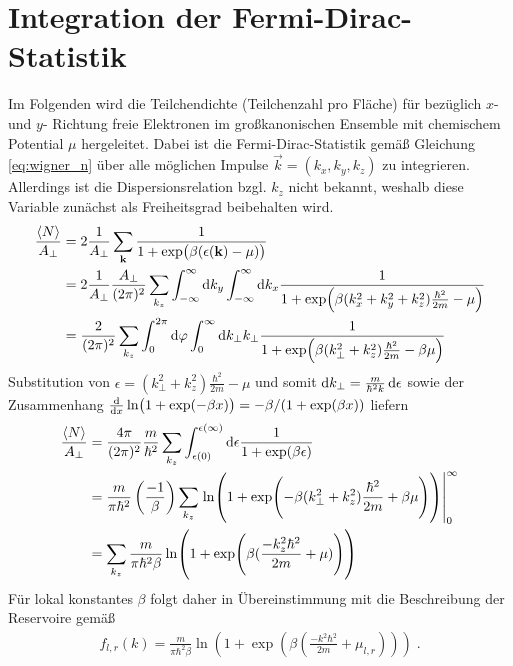 \section{Integration der Fermi-Dirac-Statistik}
\label{sec:A_2}
Im Folgenden wird die Teilchendichte (Teilchenzahl pro Fläche) für bezüglich $x$- und $y$- Richtung freie Elektronen im großkanonischen Ensemble mit chemischem Potential $\mu$ hergeleitet. Dabei ist die Fermi-Dirac-Statistik gemäß Gleichung \eqref{eq:wigner_n} über alle möglichen Impulse $\vec{k}=(k_x,k_y,k_z)$ zu integrieren. Allerdings ist die Dispersionsrelation bzgl. $k_z$ nicht bekannt, weshalb diese Variable zunächst als Freiheitsgrad beibehalten wird.
\begin{align*}
  \frac{\expval{N}}{A_{\perp}} &= 2\frac{1}{A_{\perp}}\sum_{\vb{k}}\frac{1}{1+\exp(\beta(\epsilon(\vb{k}) - \mu))} \\
    &= 2\frac{1}{A_{\perp}}  \frac{A_{\perp}}{(2\pi)^2} \sum_{k_z}\int_{-\infty}^{\infty} \mathop{}\!\mathrm{d} k_y \int_{-\infty}^{\infty} \mathop{}\!\mathrm{d} k_x \frac{1}{1+\exp(\beta(k_x^2 + k_y^2 + k_z^2)\frac{\hbar^2}{2m} - \mu)} \\
    &= \frac{2}{(2\pi)^2} \sum_{k_z} \int_0^{2\pi} \mathop{}\!\mathrm{d} \varphi \int_0^{\infty} \mathop{}\!\mathrm{d} k_{\perp} k_{\perp} \frac{1}{1+\exp(\beta(k_{\perp}^2 + k_z^2)\frac{\hbar^2}{2m} - \beta \mu)}
\end{align*}
Substitution von $\epsilon = (k^2_{\perp} + k_z^2)\frac{\hbar^2}{2m} - \mu$ und somit $\mathop{}\!\mathrm{d} k_\perp = \frac{m}{\hbar^2 k}\mathop{}\!\mathrm{d} \epsilon$ sowie der Zusammenhang $\frac{\mathrm{d}}{\mathrm{d}x}\ln(1+\exp(-\beta x)) = -\beta / (1+\exp(\beta x))$ liefern
\begin{align*}
  \frac{\expval{N}}{A_{\perp}} &= \frac{4\pi}{(2\pi)^2} \frac{m}{\hbar^2} \sum_{k_z} \int_{\epsilon(0)}^{{\epsilon(\infty)}} \mathop{}\!\mathrm{d} \epsilon \frac{1}{1+\exp(\beta\epsilon)} \\
    &= \frac{m}{\pi\hbar^2}\left( \frac{-1}{\beta}\right) \sum_{k_z} \left.\ln(1+\exp(-\beta(k_{\perp}^2 + k_z^2)\frac{\hbar^2}{2m} + \beta\mu))\right|_0^{\infty} \\
    &= \sum_{k_z} \frac{m}{\pi\hbar^2\beta} \ln(1+\exp(\beta(\frac{- k_z^2\hbar^2}{2m} + \mu)))
\end{align*}
Für lokal konstantes $\beta$ folgt daher in Übereinstimmung mit \cite{frensley2} die Beschreibung der Reservoire gemäß
\begin{align}
  f_{l,r} (k) = \frac{m}{\pi\hbar^2\beta} \ln(1+\exp(\beta(\frac{- k^2\hbar^2}{2m} + \mu_{l,r}))) \; .
\end{align}

